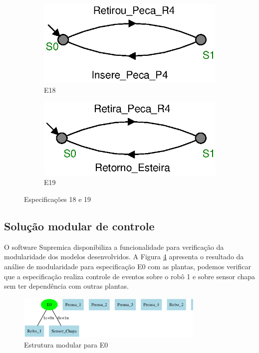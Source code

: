 \begin{figure}[H]%
  \centering
  \begin{subfigure}{0.45\textwidth}
      \centering
      \includegraphics[width=\textwidth]{imagens/E18.eps}
      \caption{E18}
      \label{fig:e18}
  \end{subfigure}
  \hfill
  \begin{subfigure}{0.45\textwidth}
      \centering
      \includegraphics[width=\textwidth]{imagens/E19.eps}
      \caption{E19}
      \label{fig:e19}
  \end{subfigure}
  \caption{Especificações 18 e 19}
  \label{fig:e1819}
\end{figure}

\subsection{Solução modular de controle}
O software Supremica \cite{Supremica2020} disponibiliza a funcionalidade para verificação da modularidade dos modelos desenvolvidos.
A Figura \ref{fig:modulare0} apresenta o resultado da análise de modularidade para especificação E0 com as plantas, podemos verificar que a especificação realiza controle de eventos sobre o robô 1 e sobre sensor chapa sem ter dependência com outras plantas.

\begin{figure}[H]%
  \centering
  \includegraphics[width=0.8\textwidth]{imagens/modular-E0.eps}
  \caption{Estrutura modular para E0}\label{fig:modulare0}
\end{figure}

